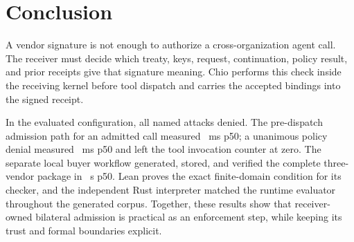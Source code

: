 \section{Conclusion}

A vendor signature is not enough to authorize a cross-organization agent call.
The receiver must decide which treaty, keys, request, continuation, policy
result, and prior receipts give that signature meaning. Chio performs this
check inside the receiving kernel before tool dispatch and carries the accepted
bindings into the signed receipt.

In the evaluated configuration, all \PSThreatCaseCount{} named attacks denied.
The pre-dispatch admission path for an admitted call measured
\PSPredispatchAllowPFiftyMs~ms p50; a unanimous policy denial measured
\PSPredispatchDenyPFiftyMs~ms p50 and left the tool invocation counter at zero.
The separate local buyer workflow generated, stored, and verified the complete
three-vendor package in \PSBuyerWorkflowPFiftySec~s p50. Lean proves the exact
finite-domain condition for its checker, and the independent Rust interpreter
matched the runtime evaluator throughout the
generated corpus. Together, these results show that receiver-owned bilateral
admission is practical as an enforcement step, while keeping its trust and
formal boundaries explicit.

